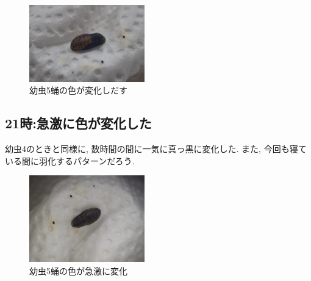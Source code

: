 \documentclass{jsarticle}
\begin{document}
\begin{figure}[htbp]
  \begin{center}
    \includegraphics[width=5cm]{photo14/Larva5-pupa.JPG}
  \end{center}
  \caption{幼虫5蛹の色が変化しだす}
\end{figure}

\subsection{21時:急激に色が変化した}
幼虫4のときと同様に, 数時間の間に一気に真っ黒に変化した. 
また, 今回も寝ている間に羽化するパターンだろう. 

\begin{figure}[htbp]
  \begin{center}
    \includegraphics[width=5cm]{photo14/Larva5-pupa2.JPG}
  \end{center}
  \caption{幼虫5蛹の色が急激に変化}
\end{figure}
\end{document}
